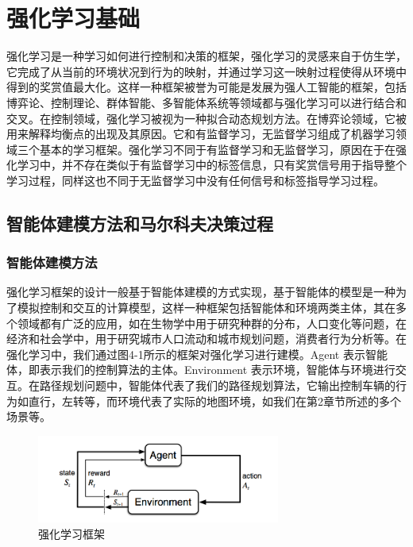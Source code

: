 \documentclass{standalone}
\begin{document}
\chapter{强化学习基础}

强化学习是一种学习如何进行控制和决策的框架，强化学习的灵感来自于仿生学，它完成了从当前的环境状况到行为的映射，并通过学习这一映射过程使得从环境中得到的奖赏值最大化。这样一种框架被誉为可能是发展为强人工智能的框架，包括博弈论、控制理论、群体智能、多智能体系统等领域都与强化学习可以进行结合和交叉。在控制领域，强化学习被视为一种拟合动态规划方法。在博弈论领域，它被用来解释均衡点的出现及其原因。它和有监督学习，无监督学习组成了机器学习领域三个基本的学习框架。强化学习不同于有监督学习和无监督学习，原因在于在强化学习中，并不存在类似于有监督学习中的标签信息，只有奖赏信号用于指导整个学习过程，同样这也不同于无监督学习中没有任何信号和标签指导学习过程。\par

\section{智能体建模方法和马尔科夫决策过程}
\subsection{智能体建模方法}
强化学习框架的设计一般基于智能体建模的方式实现，基于智能体的模型是一种为了模拟控制和交互的计算模型，这样一种框架包括智能体和环境两类主体，其在多个领域都有广泛的应用，如在生物学中用于研究种群的分布，人口变化等问题，在经济和社会学中，用于研究城市人口流动和城市规划问题，消费者行为分析等。在强化学习中，我们通过图4-1所示的框架对强化学习进行建模。Agent 表示智能体，即表示我们的控制算法的主体。Environment 表示环境，智能体与环境进行交互。在路径规划问题中，智能体代表了我们的路径规划算法，它输出控制车辆的行为如直行，左转等，而环境代表了实际的地图环境，如我们在第2章节所述的多个场景等。
\begin{figure}[H]
	\includegraphics[width=8.0cm]{pic/4-1.png}
	\caption{强化学习框架}
	\label{4-1}
\end{figure}
\end{document}
